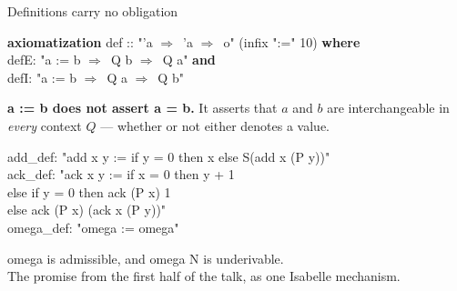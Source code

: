 \documentclass[aspectratio=169,11pt]{beamer}
\newcommand{\im}{\ensuremath{\Longrightarrow}}
\newcommand{\code}[1]{{\ttfamily\footnotesize #1}}
\newcommand{\key}[1]{{\color{accent}\textbf{#1}}}
\begin{document}
\begin{frame}{Definitions carry no obligation}
  \vspace{0.2em}
  \begin{flushleft}\code{%
    \key{axiomatization} def :: "'a \im\ 'a \im\ o" (infix ":=" 10) \key{where}\\
    \phantom{axax}defE: "a := b \im\ Q b \im\ Q a" \key{and}\\
    \phantom{axax}defI: "a := b \im\ Q a \im\ Q b"%
  }\end{flushleft}
  \vspace{0.4em}
  \key{\code{a := b} does not assert \code{a = b}.} It asserts that $a$ and $b$ are
  interchangeable in \emph{every} context $Q$ --- whether or not either denotes a value.
  \vspace{0.6em}
  \pause
  \begin{flushleft}\code{%
    add\_def: "add x y := if y = 0 then x else S(add x (P y))"\\
    ack\_def: "ack x y := if x = 0 then y + 1\\
    \phantom{ack\_def: "ack x y := }else if y = 0 then ack (P x) 1\\
    \phantom{ack\_def: "ack x y := }else ack (P x) (ack x (P y))"\\
    omega\_def: "omega := omega"%
  }\end{flushleft}
  \vfill
  \begin{center}
    \code{omega} is admissible, and \code{omega N} is underivable.\\[0.2em]
    {\small The promise from the first half of the talk, as one Isabelle mechanism.}
  \end{center}
  \vfill
\end{frame}
\end{document}
